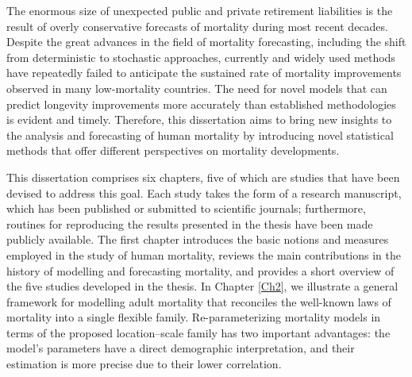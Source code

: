 \documentclass[Thesis]{subfiles}
\begin{document}
The enormous size of unexpected public and private retirement liabilities is the result of overly conservative forecasts of mortality during most recent decades. Despite the great advances in the field of mortality forecasting, including the shift from deterministic to stochastic approaches, currently and widely used methods have repeatedly failed to anticipate the sustained rate of mortality improvements observed in many low-mortality countries. The need for novel models that can predict longevity improvements more accurately than established methodologies is evident and timely. Therefore, this dissertation aims to bring new insights to the analysis and forecasting of human mortality by introducing novel statistical methods that offer different perspectives on mortality developments. 

This dissertation comprises six chapters, five of which are studies that have been devised to address this goal. Each study takes the form of a research manuscript, which has been published or submitted to scientific journals; furthermore, routines for reproducing the results presented in the thesis have been made publicly available. The first chapter introduces the basic notions and measures employed in the study of human mortality, reviews the main contributions in the history of modelling and forecasting mortality, and provides a short overview of the five studies developed in the thesis. In Chapter \ref{Ch2}, we illustrate a general framework for modelling adult mortality that reconciles the well-known laws of mortality into a single flexible family. Re-parameterizing mortality models in terms of the proposed location--scale family has two important advantages: the model's parameters have a direct demographic interpretation, and their estimation is more precise due to their lower correlation. 
\end{document}
